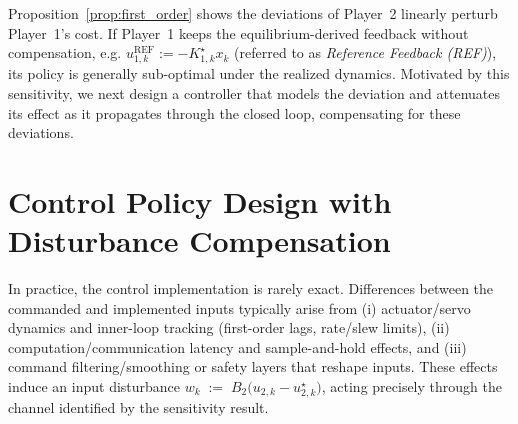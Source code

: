 \documentclass[letterpaper, 10 pt, conference]{ieeeconf}  %
\newtheorem{remark}{\textbf{Remark}}
\begin{document}



Proposition~\ref{prop:first_order} shows the deviations of Player~2 linearly perturb Player~1’s cost. If Player~1 keeps the equilibrium-derived feedback without compensation, e.g. $u_{1,k}^{\mathrm{REF}}:=-K^\star_{1,k}x_k$ (referred to as \textit{Reference Feedback (REF)}), its policy is generally sub-optimal under the realized dynamics. Motivated by this sensitivity, we next design a controller that models the deviation and attenuates its effect as it propagates through the closed loop, compensating for these deviations.


\section{Control Policy Design with Disturbance Compensation}
\label{sec: control policy design}

In practice, the control implementation is rarely exact. Differences between the commanded and implemented inputs typically arise from (i) actuator/servo dynamics and inner-loop tracking (first-order lags, rate/slew limits), (ii) computation/communication latency and sample-and-hold effects, and (iii) command filtering/smoothing or safety layers that reshape inputs.
These effects induce an input disturbance $w_k \;:=\; B_2\big(u_{2,k}-u_{2,k}^\star\big)$, acting precisely through the channel identified by the sensitivity result.
\end{document}
